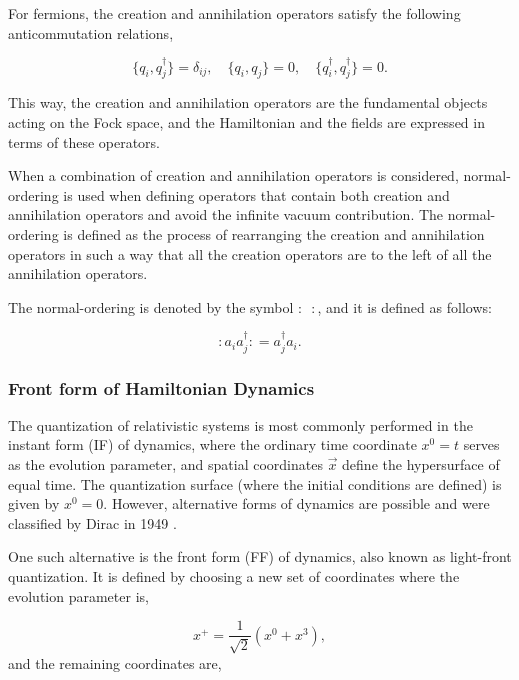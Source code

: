 \documentclass[11pt,a4paper,twoside,pdf]{article}
\numberwithin{equation}{section}
\begin{document}
For fermions, the creation and annihilation operators satisfy the following anticommutation
relations,

\begin{equation}
    \{q_i, q_j^\dagger\} = \delta_{ij}, \quad
    \{q_i, q_j\} = 0, \quad
    \{q_i^\dagger, q_j^\dagger\} = 0.
\end{equation}

This way, the creation and annihilation operators are the fundamental objects acting
on the Fock space, and the Hamiltonian and the fields are expressed in terms of 
these operators.

When a combination of creation and annihilation operators is considered, normal-ordering is
used when defining operators that contain both creation and annihilation operators
and avoid the infinite vacuum contribution. The normal-ordering is defined as the 
process of rearranging the creation and annihilation operators in such a way that 
all the creation operators are to the left of all the annihilation operators.

The normal-ordering is denoted by the symbol $:\,\,\,:$, and it is defined as follows:

\begin{equation}
    :a_i a_j^\dagger: =  a_j^\dagger a_i.
\end{equation}

\subsubsection{Front form of Hamiltonian Dynamics}
The quantization of relativistic systems is most commonly performed in the instant form 
(IF) of dynamics, where the ordinary time coordinate \( x^0 = t \) serves as the evolution 
parameter, and spatial coordinates \( \vec{x} \) define the hypersurface of equal time.
The quantization surface (where the initial conditions are defined) is given by $x^0 = 0$.
However, alternative forms of dynamics are possible and were classified by Dirac in 
1949 \cite{dirac_front_forms_1949}.

One such alternative is the front form (FF) of dynamics, also known as light-front 
quantization. It is defined by choosing a new set of coordinates where the evolution 
parameter is,

\begin{equation}
    x^+ = \frac{1}{\sqrt{2}} (x^0 + x^3),
\end{equation}
and the remaining coordinates are,
\end{document}
